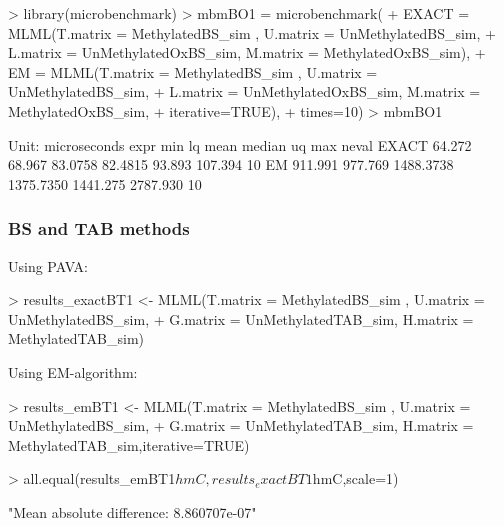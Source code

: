 \documentclass{article}
\begin{document}
\begin{Schunk}
\begin{Sinput}
>  library(microbenchmark)
>  mbmBO1 = microbenchmark(
+     EXACT = MLML(T.matrix = MethylatedBS_sim , U.matrix = UnMethylatedBS_sim,
+                  L.matrix = UnMethylatedOxBS_sim, M.matrix = MethylatedOxBS_sim),
+     EM =    MLML(T.matrix = MethylatedBS_sim , U.matrix = UnMethylatedBS_sim,
+                  L.matrix = UnMethylatedOxBS_sim, M.matrix = MethylatedOxBS_sim,
+                  iterative=TRUE),
+     times=10)
>  mbmBO1
\end{Sinput}
\begin{Soutput}
Unit: microseconds
  expr     min      lq      mean    median       uq      max neval
 EXACT  64.272  68.967   83.0758   82.4815   93.893  107.394    10
    EM 911.991 977.769 1488.3738 1375.7350 1441.275 2787.930    10
\end{Soutput}
\end{Schunk}


\subsubsection{BS and TAB methods}

Using PAVA:
\begin{Schunk}
\begin{Sinput}
> results_exactBT1 <- MLML(T.matrix = MethylatedBS_sim , U.matrix = UnMethylatedBS_sim,
+ G.matrix = UnMethylatedTAB_sim, H.matrix = MethylatedTAB_sim)
\end{Sinput}
\end{Schunk}

Using EM-algorithm:
\begin{Schunk}
\begin{Sinput}
>  results_emBT1 <- MLML(T.matrix = MethylatedBS_sim , U.matrix = UnMethylatedBS_sim,
+  G.matrix = UnMethylatedTAB_sim, H.matrix = MethylatedTAB_sim,iterative=TRUE)
\end{Sinput}
\end{Schunk}


\begin{Schunk}
\begin{Sinput}
>  all.equal(results_emBT1$hmC,results_exactBT1$hmC,scale=1)
\end{Sinput}
\begin{Soutput}
[1] "Mean absolute difference: 8.860707e-07"
\end{Soutput}
\end{Schunk}
\end{document}
